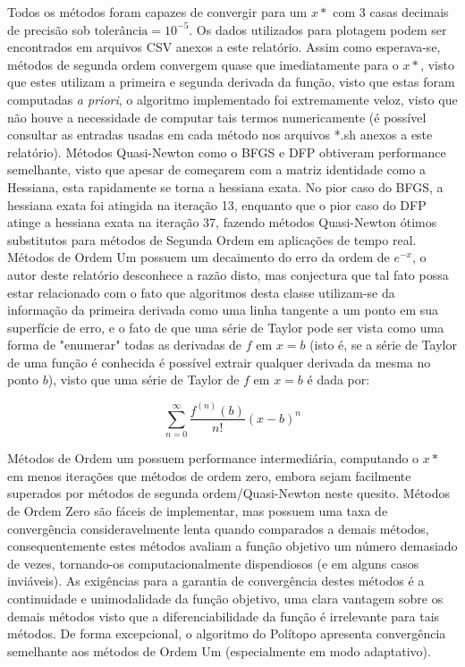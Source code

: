 \documentclass[fleqn, 11pt]{article}
\begin{document}
Todos os métodos foram capazes de convergir para um $x*$ com $3$ casas decimais de precisão sob $\text{tolerância} = 10^{-5}$. Os dados utilizados para plotagem podem ser encontrados em arquivos CSV anexos a este relatório. Assim como esperava-se, métodos de segunda ordem convergem quase que imediatamente para o $x*$, visto que estes utilizam a primeira e segunda derivada da função, visto que estas foram computadas \textit{a priori}, o algoritmo implementado foi extremamente veloz, visto que não houve a necessidade de computar tais termos numericamente (é possível consultar as entradas usadas em cada método nos arquivos *.sh anexos a este relatório). Métodos Quasi-Newton como o BFGS e DFP obtiveram performance semelhante, visto que apesar de começarem com a matriz identidade como a Hessiana, esta rapidamente se torna a hessiana exata. No pior caso do BFGS, a hessiana exata foi atingida na iteração 13, enquanto que o pior caso do DFP atinge a hessiana exata na iteração 37, fazendo métodos Quasi-Newton ótimos substitutos para métodos de Segunda Ordem em aplicações de tempo real. \newline
Métodos de Ordem Um possuem um decaimento do erro da ordem de $e^{-x}$, o autor deste relatório desconhece a razão disto, mas conjectura que tal fato possa estar relacionado com o fato que algoritmos desta classe utilizam-se da informação da primeira derivada como uma linha tangente a um ponto em sua superfície de erro, e o fato de que uma série de Taylor pode ser vista como uma forma de "enumerar" todas as derivadas de $f$ em $x=b$ (isto é, se a série de Taylor de uma função é conhecida é possível extrair qualquer derivada da mesma no ponto $b$), visto que uma série de Taylor de $f$ em $x=b$ é dada por:

\begin{equation}
\sum_{n=0}^{\infty} \frac{f^{(n)}(b)}{n!} (x-b)^n
\end{equation}

Métodos de Ordem um possuem performance intermediária, computando o $x*$ em menos iterações que métodos de ordem zero, embora sejam facilmente superados por métodos de segunda ordem/Quasi-Newton neste quesito.\newline
Métodos de Ordem Zero são fáceis de implementar, mas possuem uma taxa de convergência consideravelmente lenta quando comparados a demais métodos, consequentemente estes métodos avaliam a função objetivo um número demasiado de vezes, tornando-os computacionalmente dispendiosos (e em alguns casos inviáveis). As exigências para a garantia de convergência destes métodos é a continuidade e unimodalidade da função objetivo, uma clara vantagem sobre os demais métodos visto que a diferenciabilidade da função é irrelevante para tais métodos. De forma excepcional, o algoritmo do Polítopo apresenta convergência semelhante aos métodos de Ordem Um (especialmente em modo adaptativo)\cite{gao2012implementing}.
\newpage
\end{document}
